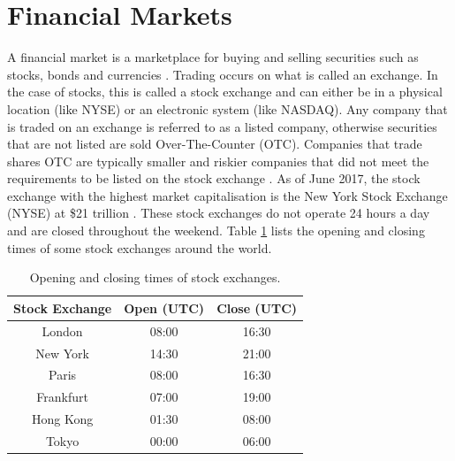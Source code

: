 \documentclass{UoYCSproject}
\begin{document}
\section{Financial Markets}
A financial market is a marketplace for buying and selling securities such as stocks, bonds and currencies \cite{financialmarket}. Trading occurs on what is called an exchange. In the case of stocks, this is called a stock exchange and can either be in a physical location (like NYSE) or an electronic system (like NASDAQ). Any company that is traded on an exchange is referred to as a listed company, otherwise securities that are not listed are sold Over-The-Counter (OTC). Companies that trade shares OTC are typically smaller and riskier companies that did not meet the requirements to be listed on the stock exchange \cite{stockexchange}. As of June 2017, the stock exchange with the highest market capitalisation is the New York Stock Exchange (NYSE) at \$21 trillion \cite{nyse}. 
These stock exchanges do not operate 24 hours a day and are closed throughout the weekend. Table \ref{tab:markets} lists the opening and closing times of some stock exchanges around the world. 

\begin{table}[h]
    \centering
    \begin{tabular}{|c|c|c|} \hline
        \textbf{Stock Exchange} & \textbf{Open (UTC)} & \textbf{Close (UTC)} \\ \hline
        London & 08:00 & 16:30 \\
        New York & 14:30 & 21:00 \\
        Paris & 08:00 & 16:30 \\
        Frankfurt & 07:00 & 19:00 \\
        Hong Kong & 01:30 & 08:00 \\
        Tokyo & 00:00 & 06:00 \\
        \hline
    \end{tabular}
    \caption{Opening and closing times of stock exchanges.}
    \label{tab:markets}
\end{table}
\end{document}
